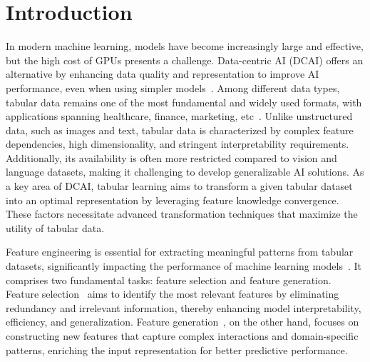 \vspace{-0.4cm}
\section{Introduction}

In modern machine learning, models have become increasingly large and effective, but the high cost of GPUs presents a challenge. Data-centric AI (DCAI) offers an alternative by enhancing data quality and representation to improve AI performance, even when using simpler models~\cite{kumar2024opportunities}.
Among different data types, tabular data remains one of the most fundamental and widely used formats, with applications spanning healthcare, finance, marketing, etc~\cite{liu2024calorie,safriandono2024analyzing,lu2020traumatic}. Unlike unstructured data, such as images and text, tabular data is characterized by complex feature dependencies, high dimensionality, and stringent interpretability requirements. Additionally, its availability is often more restricted compared to vision and language datasets, making it challenging to develop generalizable AI solutions. As a key area of DCAI, tabular learning aims to transform a given tabular dataset into an optimal representation by leveraging feature knowledge convergence. These factors necessitate advanced transformation techniques that maximize the utility of tabular data.


Feature engineering is essential for extracting meaningful patterns from tabular datasets, significantly impacting the performance of machine learning models~\cite{heaton2016empirical}. It comprises two fundamental tasks: feature selection and feature generation. Feature selection~\cite{mrmr,biesiada2008feature,ding2014identification,lasso1996} aims to identify the most relevant features by eliminating redundancy and irrelevant information, thereby enhancing model interpretability, efficiency, and generalization. Feature generation~\cite{chen2021techniques,kusiak2001feature,kanter2015deep,azim2024feature}, on the other hand, focuses on constructing new features that capture complex interactions and domain-specific patterns, enriching the input representation for better predictive performance. 

